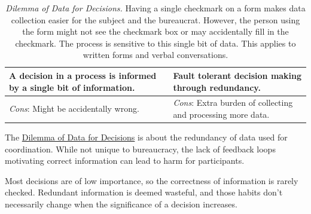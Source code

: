 

  


\begin{center}
\begin{table}[H] %
\begin{tabular}{ | m{\dilemmatablewidth}| m{\dilemmatablewidth} | } 
  \hline
  \textbf{A decision in a process is informed by a single bit of information.} & 
  \textbf{Fault tolerant decision making through redundancy.} \\ 
  \hline
  \textit{Cons}: Might be accidentally wrong. &
  \textit{Cons}: Extra burden of collecting and processing more data. \\  
  \hline
\end{tabular}
\caption{
\textit{Dilemma of Data for Decisions.}
Having a single checkmark on a form makes data collection easier for the subject and the bureaucrat. However, the person using the form might not see the checkmark box or may accidentally fill in the checkmark. The process is sensitive to this single bit of data. This applies to written forms and verbal conversations.
}
\label{table:single-bit-decision}
\end{table}
\end{center}

The \href{table:single-bit-decision}{Dilemma of Data for Decisions} is about the redundancy of data used for coordination. While not unique to bureaucracy, the lack of feedback loops motivating correct information can lead to harm for participants.

Most decisions are of low importance, so the correctness of information is rarely checked. Redundant information is deemed wasteful, and those habits don't necessarily change when the significance of a decision increases.


